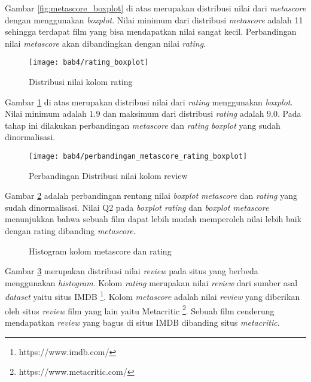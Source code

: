 Gambar \ref{fig:metascore_boxplot} di atas merupakan distribusi nilai dari \textit{metascore} dengan menggunakan \textit{boxplot}. Nilai minimum dari distribusi \textit{metascore} adalah 11 sehingga terdapat film yang bisa mendapatkan nilai sangat kecil. Perbandingan nilai \textit{metascore} akan dibandingkan dengan nilai \textit{rating}.

\begin{figure}[H]
	\centering  
	\texttt{[image: bab4/rating\_boxplot]}   
	\caption{Distribusi nilai kolom rating}
	\label{fig:rating_boxplot} 
\end{figure} 

Gambar \ref{fig:rating_boxplot} di atas merupakan distribusi nilai dari \textit{rating} menggunakan \textit{boxplot}. Nilai minimum adalah $1.9$ dan maksimum dari distribusi \textit{rating} adalah $9.0$. Pada tahap ini dilakukan perbandingan
\textit{metascore} dan \textit{rating} \textit{boxplot} yang sudah dinormalisasi. 


\begin{figure}[H]
	\centering  
	\texttt{[image: bab4/perbandingan\_metascore\_rating\_boxplot]}   
	\caption{Perbandingan Distribusi nilai kolom review}
	\label{fig:perbandingan_metascore_rating_boxplot} 
\end{figure} 

Gambar \ref{fig:perbandingan_metascore_rating_boxplot} adalah perbandingan rentang nilai \textit{boxplot} \textit{metascore} dan \textit{rating} yang sudah dinormalisasi. Nilai Q2 pada \textit{boxplot rating} dan \textit{boxplot metascore} menunjukkan bahwa sebuah film dapat lebih mudah memperoleh nilai lebih baik dengan rating dibanding \textit{metascore}.

\begin{figure}[H]
    \centering
    \qquad
    \caption{Histogram kolom metascore dan rating}%
    \label{fig:metascore_ratinghistogram}%
\end{figure}


Gambar \ref{fig:metascore_ratinghistogram} merupakan distribusi nilai \textit{review} pada situs yang berbeda menggunakan \textit{histogram}. Kolom \textit{rating} merupakan nilai \textit{review} dari sumber asal \textit{dataset} yaitu situs IMDB \footnote{https://www.imdb.com/}. Kolom \textit{metascore} adalah nilai \textit{review} yang diberikan oleh situs \textit{review} film yang lain yaitu Metacritic \footnote{https://www.metacritic.com/}. Sebuah film cenderung mendapatkan \textit{review} yang bagus di situs IMDB dibanding situs \textit{metacritic}.

